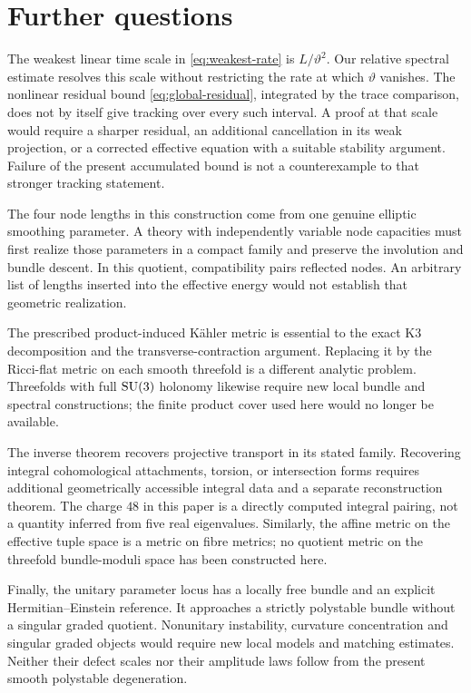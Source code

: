 \section{Further questions}\label{sec:further}

The weakest linear time scale in \eqref{eq:weakest-rate} is
$L/\vartheta^2$. Our relative spectral estimate resolves this scale
without restricting the rate at which $\vartheta$ vanishes. The
nonlinear residual bound \eqref{eq:global-residual}, integrated by
the trace comparison, does not by itself give tracking over every
such interval. A proof at that scale would require a sharper residual,
an additional cancellation in its weak projection, or a corrected
effective equation with a suitable stability argument. Failure of the
present accumulated bound is not a counterexample to that stronger
tracking statement.

The four node lengths in this construction come from one genuine
elliptic smoothing parameter. A theory with independently variable
node capacities must first realize those parameters in a compact
family and preserve the involution and bundle descent. In this
quotient, compatibility pairs reflected nodes. An arbitrary list of
lengths inserted into the effective energy would not establish that
geometric realization.

The prescribed product-induced K\"ahler metric is essential to the
exact K3 decomposition and the transverse-contraction argument.
Replacing it by the Ricci-flat metric on each smooth threefold is
a different analytic problem. Threefolds with full $\operatorname{SU}(3)$ holonomy
likewise require new local bundle and spectral constructions; the
finite product cover used here would no longer be available.

The inverse theorem recovers projective transport in its stated
family. Recovering integral cohomological attachments, torsion, or
intersection forms requires additional geometrically accessible
integral data and a separate reconstruction theorem. The charge
$48$ in this paper is a directly computed integral pairing, not a
quantity inferred from five real eigenvalues. Similarly, the affine
metric on the effective tuple space is a metric on fibre metrics;
no quotient metric on the threefold bundle-moduli space has been
constructed here.

Finally, the unitary parameter locus has a locally free bundle and
an explicit Hermitian--Einstein reference. It approaches a strictly
polystable bundle without a singular graded quotient. Nonunitary
instability, curvature concentration and singular graded objects
would require new local models and matching estimates. Neither their
defect scales nor their amplitude laws follow from the present
smooth polystable degeneration.
